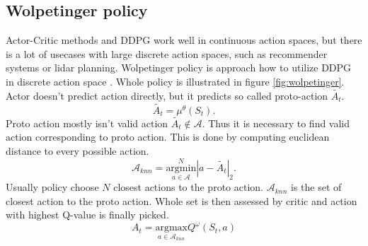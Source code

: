 \subsection{Wolpetinger policy}
Actor-Critic methods and DDPG work well in continuous action spaces, but there is a lot of usecases with large discrete action spaces, such as recommender systems or lidar planning. Wolpetinger policy is approach how to utilize DDPG in discrete action space \cite{dulac2015}. Whole policy is illustrated in figure \ref{fig:wolpetinger}. Actor doesn't predict action directly, but it predicts so called proto-action $\tilde{A_t}$.
\begin{equation}
\tilde{A_t} = \mu^\theta(S_t).
\end{equation}
Proto action mostly isn't valid action $\tilde{A_t} \notin \mathcal{A}$. Thus it is necessary to find valid action corresponding to proto action. This is done by computing euclidean distance to every possible action.
\begin{equation} \label{eq:knn}
\mathcal{A}_{knn} = \overset{N}{\underset{a \in \mathcal{A}}{{\text{argmin}}}} | a - \tilde{A_t} |_2 .
\end{equation}
Usually policy choose $N$ closest actions to the proto action. $\mathcal{A}_{knn}$ is the set of closest action to the proto action. Whole set is then assessed by critic and action with highest Q-value is finally picked.
\begin{equation}
A_t = \underset{a \in \mathcal{A}_{knn}}{\text{argmax}} Q^\omega(S_t, a)
\end{equation}
